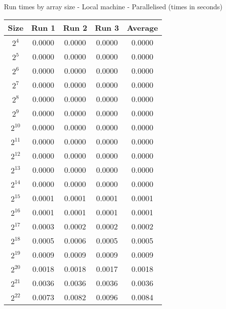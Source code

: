 \centering
\caption{Run times by array size - Local machine - Parallelised (times in seconds)}
\begin{tabular}{@{} c c c c c @{}}
\toprule
    \textbf{Size} & \textbf{Run 1}& \textbf{Run 2}& \textbf{Run 3}& \textbf{Average}\\
\midrule
    $2^4$ & 0.0000 & 0.0000 & 0.0000 & 0.0000\\
\lightrule
    $2^5$ & 0.0000 & 0.0000 & 0.0000 & 0.0000\\
\lightrule
    $2^6$ & 0.0000 & 0.0000 & 0.0000 & 0.0000\\
\lightrule
    $2^7$ & 0.0000 & 0.0000 & 0.0000 & 0.0000\\
\lightrule
    $2^8$ & 0.0000 & 0.0000 & 0.0000 & 0.0000\\
\lightrule
    $2^9$ & 0.0000 & 0.0000 & 0.0000 & 0.0000\\
\lightrule
    $2^{10}$ & 0.0000 & 0.0000 & 0.0000 & 0.0000\\
\lightrule
    $2^{11}$ & 0.0000 & 0.0000 & 0.0000 & 0.0000\\
\lightrule
    $2^{12}$ & 0.0000 & 0.0000 & 0.0000 & 0.0000\\
\lightrule
    $2^{13}$ & 0.0000 & 0.0000 & 0.0000 & 0.0000\\
\lightrule
    $2^{14}$ & 0.0000 & 0.0000 & 0.0000 & 0.0000\\
\lightrule
    $2^{15}$ & 0.0001 & 0.0001 & 0.0001 & 0.0001\\
\lightrule
    $2^{16}$ & 0.0001 & 0.0001 & 0.0001 & 0.0001\\
\lightrule
    $2^{17}$ & 0.0003 & 0.0002 & 0.0002 & 0.0002\\
\lightrule
    $2^{18}$ & 0.0005 & 0.0006 & 0.0005 & 0.0005\\
\lightrule
    $2^{19}$ & 0.0009 & 0.0009 & 0.0009 & 0.0009\\
\lightrule
    $2^{20}$ & 0.0018 & 0.0018 & 0.0017 & 0.0018\\
\lightrule
    $2^{21}$ & 0.0036 & 0.0036 & 0.0036 & 0.0036\\
\lightrule
    $2^{22}$ & 0.0073 & 0.0082 & 0.0096 & 0.0084\\
\bottomrule
\end{tabular}
\label{table:array_par_local}
